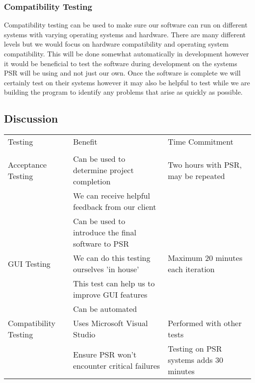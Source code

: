 \documentclass[onecolumn, draftclsnofoot,10pt, compsoc]{IEEEtran}
\begin{document}
\subsubsection{Compatibility Testing}
Compatibility testing can be used to make sure our software can run on different systems with varying operating systems and hardware. 
There are many different levels but we would focus on hardware compatibility and operating system compatibility. 
This will be done somewhat automatically in development however it would be beneficial to test the software during development on the systems PSR will be using and not just our own. 
Once the software is complete we will certainly test on their systems however it may also be helpful to test while we are building the program to identify any problems that arise as quickly as possible.

\subsection{Discussion}

\vspace{1cm}
\begin{center}
\begin{tabular}{ | l || l | l | } 
\hline
Testing   & Benefit   & Time Commitment   \\
            &       &       \\
\hline
\hline
Acceptance Testing          & Can be used to determine project completion & Two hours with PSR, may be repeated \\
                            & We can receive helpful feedback from our client & \\
                            & Can be used to introduce the final software to PSR & \\
            
\hline
GUI Testing                 & We can do this testing ourselves 'in house' & Maximum 20 minutes each iteration \\ 
                            & This test can help us to improve GUI features & \\
                            & Can be automated & \\
\hline
Compatibility Testing       & Uses Microsoft Visual Studio & Performed with other tests \\ 
                            & Ensure PSR won't encounter critical failures & Testing on PSR systems adds 30 minutes \\
\hline
\end{tabular}
\end{center}
\end{document}
